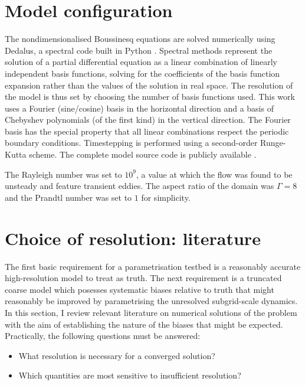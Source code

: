 \documentclass[../main.tex]{subfiles}
\begin{document}
\section{Model configuration}
The nondimensionalised Boussinesq equations
 are solved numerically using
Dedalus, a spectral code built in Python \parencite{burns2020}. Spectral
methods represent the solution of a partial differential equation as a linear
combination of linearly independent basis functions, solving for the
coefficients of the basis function expansion rather than the values of the
solution in real space. The resolution of the model is thus set by choosing the
number of basis functions used. This work uses a Fourier (sine/cosine) basis in
the horizontal direction and a basis of Chebyshev polynomials (of the first
kind) in the vertical direction. The Fourier basis has the special property
that all linear combinations respect the periodic boundary conditions.
Timestepping is performed using a second-order Runge-Kutta scheme. The complete
model source code is publicly available .

The Rayleigh number was set to $10^9$, a value at which the flow was found to
be unsteady and feature transient eddies. The aspect ratio of the domain was
$\Gamma = 8$ and the Prandtl number was set to $1$ for simplicity.



\section{Choice of resolution: literature}


The first basic requirement for a parametrisation testbed is a reasonably
accurate high-resolution model to treat as truth. The next requirement is a
truncated coarse model which posesses systematic biases relative to truth that
might reasonably be improved by parametrising the unresolved subgrid-scale
dynamics. In this section, I review relevant literature on numerical solutions
of the \rb{} problem with the aim of establishing the nature of the biases that
might be expected. Practically, the following questions must be answered:
\begin{itemize}
    \item What resolution is necessary for a converged solution?
    \item Which quantities are most sensitive to insufficient resolution?
\end{itemize}
\end{document}
